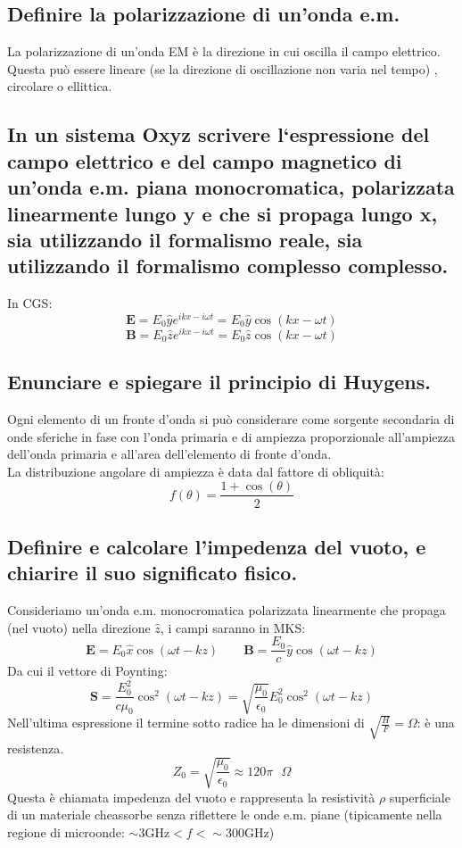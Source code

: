 \subsection[]{ Definire la polarizzazione di un’onda e.m.}
La polarizzazione di un'onda EM è la direzione in cui oscilla il campo elettrico. Questa può essere lineare (se la direzione di oscillazione non varia nel tempo) , circolare o ellittica.
\subsection[]{ In un sistema Oxyz scrivere l‘espressione del campo elettrico e del campo magnetico di un’onda e.m. piana monocromatica, polarizzata linearmente lungo y e che si propaga lungo x, sia utilizzando il formalismo reale, sia utilizzando il formalismo complesso complesso.}
In CGS:
\[
	\boldsymbol{E} = E_{0} \hat{y} e^{ikx - i\omega t} = E_{0} \hat{y} \cos\left( kx - \omega t \right)   
\] 
\[
	\boldsymbol{B} = E_{0} \hat{z} e^{ikx - i\omega t} = E_{0} \hat{z} \cos\left( kx - \omega t \right)  
\] 
\subsection[]{ Enunciare e spiegare il principio di Huygens.}
Ogni elemento di un fronte d'onda si può considerare come sorgente secondaria di onde sferiche in fase con l'onda primaria e di ampiezza proporzionale all'ampiezza dell'onda primaria e all'area dell'elemento di fronte d'onda. \\
La distribuzione angolare di ampiezza è data dal fattore di obliquità:
\[
	f\left( \theta \right) = \frac{1 + \cos\left( \theta \right) }{2} 
\] 
\subsection[]{ Definire e calcolare l'impedenza del vuoto, e chiarire il suo significato fisico. }
Consideriamo un'onda e.m. monocromatica polarizzata linearmente che propaga (nel vuoto) nella direzione $\hat{z}$, i campi saranno in MKS:
\[
	\boldsymbol{E} = E_{0} \hat{x} \cos\left( \omega t - kz \right) \quad \quad
	\boldsymbol{B} = \frac{E_{0}}{c} \hat{y} \cos\left( \omega t - kz \right) 
\] 
Da cui il vettore di Poynting:
\[
	\boldsymbol{S} = \frac{E_{0}^2}{c \mu_{0}}\cos^2\left( \omega t - kz \right) = \sqrt{\frac{\mu_0}{\epsilon_0}}E_0^2 \cos^2\left( \omega t - kz \right)   
\] 
Nell'ultima espressione il termine sotto radice ha le dimensioni di $\sqrt{\frac{H}{F}} = \Omega$: è una resistenza.  
\[
	Z_{0} = \sqrt{\frac{\mu_{0}}{\epsilon_0}} \approx 120 \pi \text{ }\Omega
\]
Questa è chiamata impedenza del vuoto e rappresenta la resistività $\rho$ superficiale di un materiale cheassorbe senza riflettere le onde e.m. piane (tipicamente nella regione di microonde: $\sim 3 \text{GHz} < f < \sim 300 \text{GHz}$) 

